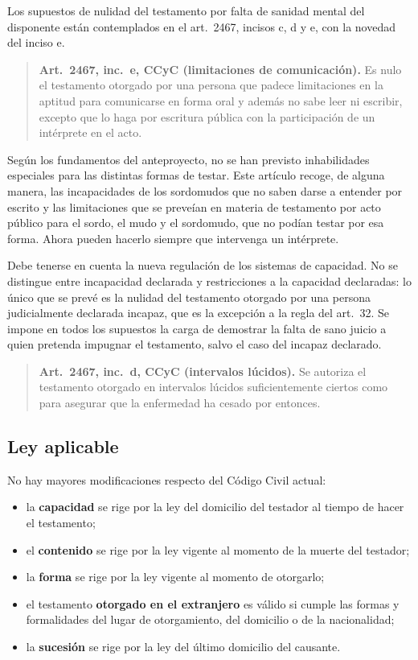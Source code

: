\documentclass[12pt,oneside]{book}
\begin{document}
Los supuestos de nulidad del testamento por falta de sanidad mental del disponente están contemplados en el art.~2467, incisos c, d y e, con la novedad del inciso e.

\begin{quote}
\textbf{Art.~2467, inc.~e, CCyC (limitaciones de comunicación).} Es nulo el testamento otorgado por una persona que padece limitaciones en la aptitud para comunicarse en forma oral y además no sabe leer ni escribir, excepto que lo haga por escritura pública con la participación de un intérprete en el acto.
\end{quote}

Según los fundamentos del anteproyecto, no se han previsto inhabilidades especiales para las distintas formas de testar. Este artículo recoge, de alguna manera, las incapacidades de los sordomudos que no saben darse a entender por escrito y las limitaciones que se preveían en materia de testamento por acto público para el sordo, el mudo y el sordomudo, que no podían testar por esa forma. Ahora pueden hacerlo siempre que intervenga un intérprete.

Debe tenerse en cuenta la nueva regulación de los sistemas de capacidad. No se distingue entre incapacidad declarada y restricciones a la capacidad declaradas: lo único que se prevé es la nulidad del testamento otorgado por una persona judicialmente declarada incapaz, que es la excepción a la regla del art.~32. Se impone en todos los supuestos la carga de demostrar la falta de sano juicio a quien pretenda impugnar el testamento, salvo el caso del incapaz declarado.

\begin{quote}
\textbf{Art.~2467, inc.~d, CCyC (intervalos lúcidos).} Se autoriza el testamento otorgado en intervalos lúcidos suficientemente ciertos como para asegurar que la enfermedad ha cesado por entonces.
\end{quote}

\subsection{Ley aplicable}

No hay mayores modificaciones respecto del Código Civil actual:

\begin{itemize}
    \item la \textbf{capacidad} se rige por la ley del domicilio del testador al tiempo de hacer el testamento;
    \item el \textbf{contenido} se rige por la ley vigente al momento de la muerte del testador;
    \item la \textbf{forma} se rige por la ley vigente al momento de otorgarlo;
    \item el testamento \textbf{otorgado en el extranjero} es válido si cumple las formas y formalidades del lugar de otorgamiento, del domicilio o de la nacionalidad;
    \item la \textbf{sucesión} se rige por la ley del último domicilio del causante.
\end{itemize}
\end{document}
